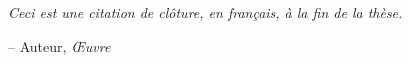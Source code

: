 \documentclass[../main]{subfiles}
\begin{document}
\clearpage
\thispagestyle{empty}
\vspace*{\fill}
\begin{otherlanguage}{french}
\begin{center}
\textit{Ceci est une citation de clôture, en français, à la fin de la thèse.}
\end{center}
\begin{flushright}
-- Auteur, \textit{Œuvre}
\end{flushright}
\end{otherlanguage}
\vspace*{\fill}
\end{document}
